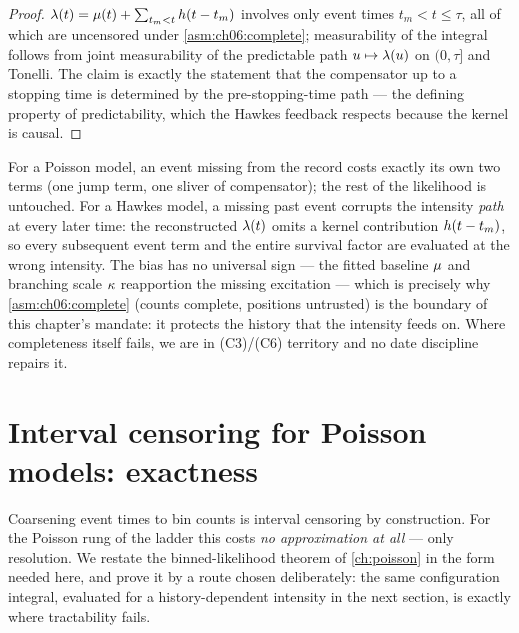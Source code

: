 \begin{proof}
$\lambda(t) = \mu(t) + \sum_{t_m < t}h(t - t_m)$ involves only event
times $t_m < t \le \tau$, all of which are uncensored under
\cref{asm:ch06:complete}; measurability of the integral follows from joint
measurability of the predictable path $u \mapsto \lambda(u)$ on $(0,\tau]$ and
Tonelli. The claim is exactly the statement that the compensator up to a
stopping time is determined by the pre-stopping-time path --- the defining
property of predictability, which the Hawkes feedback respects because the
kernel is causal.
\end{proof}

\begin{warning}\label{warn:ch06:missingpast}
For a Poisson model, an event missing from the record costs exactly its own
two terms (one jump term, one sliver of compensator); the rest of the
likelihood is untouched. For a Hawkes model, a missing past event corrupts
the intensity \emph{path} at every later time: the reconstructed
$\lambda(t)$ omits a kernel contribution $h(t - t_m)$, so every
subsequent event term and the entire survival factor are evaluated at the
wrong intensity. The bias has no universal sign --- the fitted baseline
$\mu$ and branching scale $\kappa$ reapportion the missing excitation ---
which is precisely why \cref{asm:ch06:complete} (counts complete, positions
untrusted) is the boundary of this chapter's mandate: it protects the
history that the intensity feeds on. Where completeness itself fails, we
are in (C3)/(C6) territory and no date discipline repairs it.
\end{warning}

\section{Interval censoring for Poisson models: exactness}\label{ch06:sec:icpoisson}

Coarsening event times to bin counts is interval censoring by construction.
For the Poisson rung of the ladder this costs \emph{no approximation at
all} --- only resolution. We restate the binned-likelihood theorem of
\cref{ch:poisson} in the form needed here, and prove it by a route chosen
deliberately: the same configuration integral, evaluated for a
history-dependent intensity in the next section, is exactly where
tractability fails.

